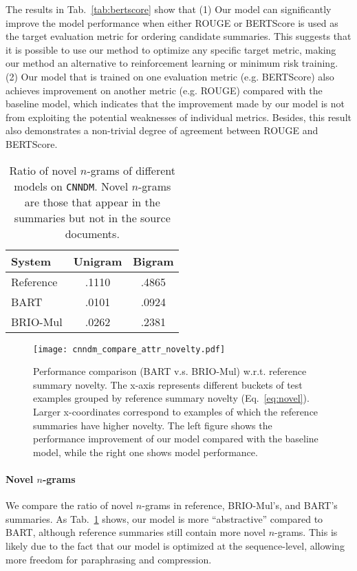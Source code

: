 \documentclass[11pt]{article}
\newcommand{\model}{BRIO\xspace}
\begin{document}
The results in Tab.~\ref{tab:bertscore} show that (1)
Our model can significantly improve the model performance when either ROUGE or BERTScore is used as the target evaluation metric for ordering candidate summaries. 
This suggests that it is possible to use our method to optimize any specific target metric, making our method an alternative to reinforcement learning or minimum risk training. 
(2) Our model that is trained on one evaluation metric (e.g. BERTScore) also achieves improvement on another metric (e.g. ROUGE) compared with the baseline model, which indicates that the improvement made by our model is not from exploiting the potential weaknesses of individual metrics.
Besides, this result also demonstrates a non-trivial degree of agreement between ROUGE and BERTScore.



\begin{table}[t!]
\centering
\small
\begin{tabular}{lcc}
\toprule
\textbf{System} & \textbf{Unigram} & \textbf{Bigram} \\
\midrule
 Reference & .1110 & .4865  \\
\midrule
 BART & .0101 & .0924 \\
 \model-Mul & .0262 & .2381 \\
\bottomrule
\end{tabular}
\caption{\label{tab:novel} Ratio of novel $n$-grams of different models on \texttt{CNNDM}.
Novel $n$-grams are those that appear in the summaries but not in the source documents.}
\end{table}

\begin{figure}[t!]
    \centering
    \texttt{[image: cnndm\_compare\_attr\_novelty.pdf]}
    \caption{Performance comparison (BART v.s. \model-Mul) w.r.t. reference summary novelty. The x-axis represents different buckets of test examples grouped by reference summary novelty (Eq.~\ref{eq:novel}). Larger x-coordinates correspond to examples of which the reference summaries have higher novelty. 
    The left figure shows the performance improvement of our model compared with the baseline model, while the right one shows model performance.}
    \label{fig:novelty}
\end{figure}


\paragraph{Novel $n$-grams} We compare the ratio of novel $n$-grams in reference, \model-Mul's, and BART's summaries.
As Tab.~\ref{tab:novel} shows, our model is more ``abstractive'' compared to BART, although reference summaries still contain more novel $n$-grams.
This is likely due to the fact that our model is optimized at the sequence-level, allowing more freedom for paraphrasing and compression.
\end{document}
